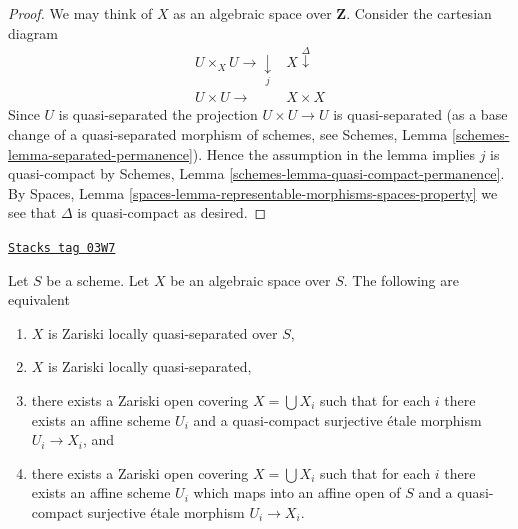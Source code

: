 \begin{proof}
We may think of $X$ as an algebraic space over $\mathbf{Z}$.
Consider the cartesian diagram
$$
\begin{array}{cc}U \times_X U \longrightarrow\underset{j}{\downarrow} & X \overset{\Delta}{\downarrow} \\ U \times U \longrightarrow & X \times X\end{array}
$$
Since $U$ is quasi-separated the projection $U \times U \to U$ is
quasi-separated (as a base change of a quasi-separated morphism
of schemes, see Schemes, Lemma \ref{schemes-lemma-separated-permanence}).
Hence the assumption in the lemma implies $j$ is quasi-compact by
Schemes, Lemma \ref{schemes-lemma-quasi-compact-permanence}.
By Spaces, Lemma \ref{spaces-lemma-representable-morphisms-spaces-property}
we see that $\Delta$ is quasi-compact as desired.
\end{proof}

\begin{lemma}
\label{spaces-properties-lemma-quasi-separated-quasi-compact-pieces}
\href{https://stacks.math.columbia.edu/tag/03W7}{\texttt{Stacks tag 03W7}}

Let $S$ be a scheme.
Let $X$ be an algebraic space over $S$.
The following are equivalent
\begin{enumerate}
\item $X$ is Zariski locally quasi-separated over $S$,
\item $X$ is Zariski locally quasi-separated,
\item there exists a Zariski open covering $X = \bigcup X_i$
such that for each $i$ there exists an affine scheme
$U_i$ and a quasi-compact surjective \'etale
morphism $U_i \to X_i$, and
\item there exists a Zariski open covering $X = \bigcup X_i$
such that for each $i$ there exists an affine scheme
$U_i$ which maps into an affine open of $S$ and a quasi-compact
surjective \'etale morphism $U_i \to X_i$.
\end{enumerate}
\end{lemma}

